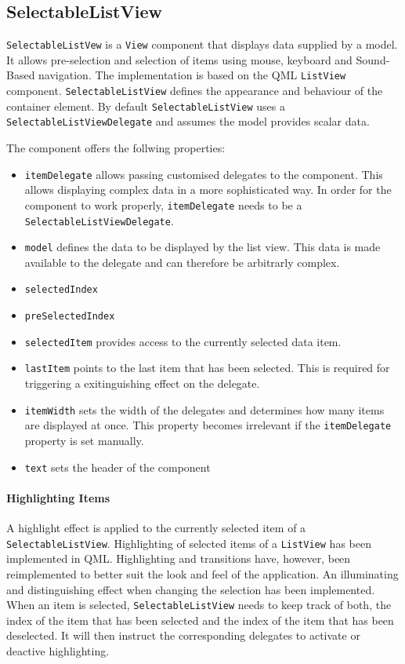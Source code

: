 \subsection{SelectableListView}
{\tt SelectableListVew} is a {\tt View} component that displays data supplied by a model. It allows pre-selection and selection of items using mouse, keyboard and Sound-Based navigation. The implementation is based on the QML {\tt ListView} component.
{\tt SelectableListView} defines the appearance and behaviour of the container element. By default {\tt SelectableListView} uses a {\tt SelectableListViewDelegate} and assumes the model provides scalar data. 

The component offers the follwing properties: 
\begin {itemize}
	\item {
		{\tt itemDelegate} allows passing customised delegates to the component. This allows displaying complex data in a more sophisticated way. In order for the component to work properly, {\tt itemDelegate} needs to be a {\tt SelectableListViewDelegate}.
	}
	\item {
		{\tt model} defines the data to be displayed by the list view. This data is made available to the delegate and can therefore be arbitrarly complex.
	}
	\item {
		{\tt selectedIndex}
	}
	\item {
		{\tt preSelectedIndex}
	}
	\item {
		{\tt selectedItem} provides access to the currently selected data item.
	}
	\item {
		{\tt lastItem} points to the last item that has been selected. This is required for triggering a exitinguishing effect on the delegate.
	}
	\item {
		{\tt itemWidth} sets the width of the delegates and determines how many items are displayed at once. This property becomes irrelevant if the {\tt itemDelegate} property is set manually.
	}
	\item {
		{\tt text} sets the header of the component
	}
\end {itemize} 

\paragraph{Highlighting Items}
A highlight effect is applied to the currently selected item of a {\tt SelectableListView}. Highlighting of selected items of a {\tt ListView} has been implemented in QML. Highlighting and transitions have, however, been reimplemented to better suit the look and feel of the application. An illuminating and distinguishing effect when changing the selection has been implemented. When an item is selected, {\tt SelectableListView} needs to keep track of both, the index of the item that has been selected and the index of the item that has been deselected. It will then instruct the corresponding delegates to activate or deactive highlighting.

